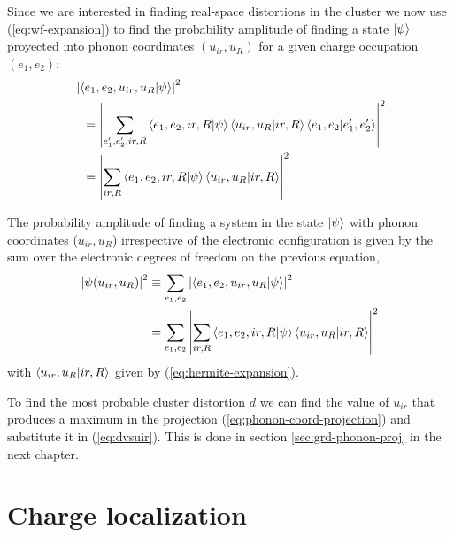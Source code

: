 Since we are interested in finding real-space distortions in the cluster we now use (\ref{eq:wf-expansion}) to find the probability amplitude of finding a state $\left | \psi \right\rangle$ proyected into phonon coordinates $(u_{ir},u_R)$ for a given charge occupation $(e_1,e_2)$:
%
\begin{equation}
  \begin{split}
    & \left|\left\langle e_1,e_2,u_{ir},u_R|\psi\right\rangle\right|^2 \\
    & \ \ = \left|\sum_{e_1',e_2',ir,R}\left\langle e_1,e_2,ir,R|\psi\right\rangle\left\langle u_{ir},u_R|ir,R\right\rangle\left\langle e_1,e_2|e_1',e_2'\right\rangle\right|^2 \\
    & \ \ = \left|\sum_{ir,R}\left\langle e_1,e_2,ir,R|\psi\right\rangle\left\langle u_{ir},u_R|ir,R\right\rangle\right|^2
  \end{split}
\end{equation}

The probability amplitude of finding a system in the state $\left | \psi \right\rangle$ with phonon coordinates ($u_{ir},u_R$) irrespective of the electronic configuration is given by the sum over the electronic degrees of freedom on the previous equation,
%
\begin{equation}
  \label{eq:phonon-coord-projection}
  \begin{split}
    \left|\psi(u_{ir}, u_R)\right|^2 & \equiv \sum_{e_1,e_2}\left|\left\langle e_1,e_2,u_{ir},u_R|\psi\right\rangle\right|^2 \\
    & = \sum_{e_1,e_2} \left|\sum_{ir,R}\left\langle e_1,e_2,ir,R|\psi\right\rangle\left\langle u_{ir},u_R|ir,R\right\rangle\right|^2
  \end{split}
\end{equation}
%
with $\left\langle u_{ir},u_R|ir,R\right\rangle$ given by (\ref{eq:hermite-expansion}).

To find the most probable cluster distortion $d$ we can find the value of $u_{ir}$ that produces a maximum in the projection (\ref{eq:phonon-coord-projection}) and substitute it in (\ref{eq:dvsuir}). This is done in section \ref{sec:grd-phonon-proj} in the next chapter.

\section{Charge localization}
\label{sec:chargeLocalization}

